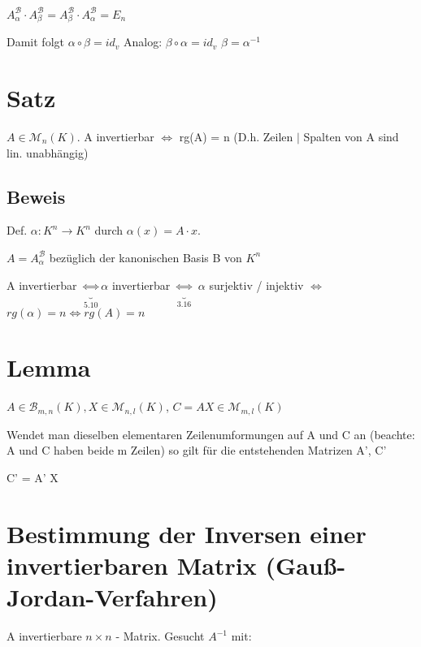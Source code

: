 \documentclass[a4paper, openany]{book}
\begin{document}
        \par \medskip

        $A_{\alpha}^{\mathcal{B}} \cdot A_{\beta}^{\mathcal{B}} = A_{\beta}^{\mathcal{B}} \cdot A_{\alpha}^{\mathcal{B}} = E_n$


        Damit folgt $\alpha \circ \beta = id_v$ Analog: $\beta \circ \alpha = id_v$ $\beta = \alpha^{-1}$

        \section{Satz}

        $A \in \mathcal{M}_n (K)$. A invertierbar $\Leftrightarrow$ rg(A) = n (D.h. Zeilen $|$ Spalten von A sind lin. unabhängig)

        \subsection{Beweis}

        Def. $\alpha : K^n \rightarrow K^n$ durch $\alpha(x) = A \cdot x$.

        $A = A_{\alpha}^{\mathcal{B}}$ bezüglich der kanonischen Basis B von $K^n$

        A invertierbar $\underbrace{\Leftrightarrow}_{5.10} \alpha$ invertierbar $\underbrace{\Leftrightarrow}_{3.16}$ $\alpha$ surjektiv / injektiv $\Leftrightarrow$ $rg(\alpha) = n \Leftrightarrow rg(A) = n$

        \section{Lemma}

        $A \in \mathcal{B}_{m,n} (K), X \in \mathcal{M}_{n,l} (K)$, $C = AX \in \mathcal{M}_{m,l} (K)$

        Wendet man dieselben elementaren Zeilenumformungen auf A und C an (beachte: A und C haben beide m Zeilen) so gilt für die entstehenden Matrizen A', C'

        \begin{center}
          C' = A' X
        \end{center}

        \section{Bestimmung der Inversen einer invertierbaren Matrix (Gauß-Jordan-Verfahren)}

        A invertierbare $n \times n$ - Matrix. Gesucht $A^{-1}$ mit:
        
\end{document}
